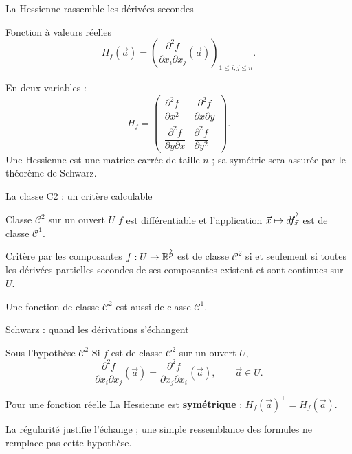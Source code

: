 \begin{frame}[t]{La Hessienne rassemble les dérivées secondes}
\coursanalyse
\begin{notion}{Fonction à valeurs réelles}
\[H_f(\vec a)=\left(\frac{\partial^2f}{\partial x_i\partial x_j}(\vec a)\right)_{1\le i,j\le n}.\]
\end{notion}
En deux variables :
\[H_f=\begin{pmatrix}
\dfrac{\partial^2 f}{\partial x^2}&\dfrac{\partial^2 f}{\partial x\partial y}\\
\dfrac{\partial^2 f}{\partial y\partial x}&\dfrac{\partial^2 f}{\partial y^2}
\end{pmatrix}.\]
\vfill Une Hessienne est une matrice carrée de taille $n$ ; sa symétrie sera assurée par le théorème de Schwarz.
\end{frame}

\begin{frame}[t]{La classe C2 : un critère calculable}
\coursanalyse
\begin{notion}{Classe $\mathcal C^2$ sur un ouvert $U$}
$f$ est différentiable et l'application $\vec x\mapsto\overrightarrow{df_{\vec x}}$ est de classe $\mathcal C^1$.
\end{notion}
\begin{theoreme}{Critère par les composantes}
$f:U\to\overrightarrow{\mathbb R^{p}}$ est de classe $\mathcal C^2$ si et seulement si toutes les dérivées partielles secondes de ses composantes existent et sont continues sur $U$.
\end{theoreme}
\vfill Une fonction de classe $\mathcal C^2$ est aussi de classe $\mathcal C^1$.
\end{frame}

\begin{frame}[t]{Schwarz : quand les dérivations s’échangent}
\coursanalyse
\begin{theoreme}{Sous l’hypothèse $\mathcal C^2$}
Si $f$ est de classe $\mathcal C^2$ sur un ouvert $U$,
\[\frac{\partial^2f}{\partial x_i\partial x_j}(\vec a)
=\frac{\partial^2f}{\partial x_j\partial x_i}(\vec a),\qquad\vec a\in U.\]
\end{theoreme}
\begin{resultat}{Pour une fonction réelle}
La Hessienne est \textbf{symétrique} : $H_f(\vec a)^\top=H_f(\vec a)$.
\end{resultat}
\vfill La régularité justifie l'échange ; une simple ressemblance des formules ne remplace pas cette hypothèse.
\end{frame}

